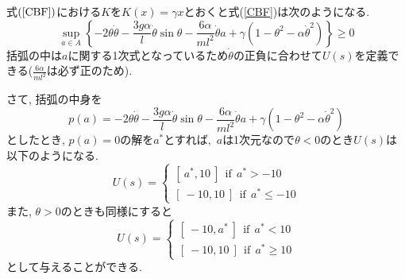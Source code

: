 \documentclass{jsarticle}
\begin{document}
式$(\ref{CBF})$における$K$を$K(x) = \gamma x$とおくと式(\ref{CBF})は次のようになる.
\begin{equation}
	\sup_{a\in A}\left\{-2\theta\dot{\theta}-\frac{3g\alpha}{l}\dot{\theta}\sin{\theta}-\frac{6\alpha}{ml^2}\dot{\theta} a+\gamma(1-\theta^2-\alpha\dot{\theta}^2)\right\} \geq 0 \label{special_cbf}
\end{equation}
括弧の中は$a$に関する1次式となっているため$\dot{\theta}$の正負に合わせて$U(s)$を定義できる($\frac{6\alpha}{ml^2}$は必ず正のため).\par
さて, 括弧の中身を
\begin{equation}
	p(a) = -2\theta\dot{\theta}-\frac{3g\alpha}{l}\dot{\theta}\sin{\theta}-\frac{6\alpha}{ml^2}\dot{\theta} a+\gamma(1-\theta^2-\alpha\dot{\theta}^2)
\end{equation}
としたとき, $p(a)=0$の解を$a^{*}$とすれば,~$a$は1次元なので$\theta<0$のとき$U(s)$は以下のようになる.
\begin{equation}
	U(s) = 
		\begin{cases}
			[~a^{*}, 10~]~~\textrm{if}~~ a^{*} > -10 \\
			[~-10, 10~]~~\textrm{if}~~ a^{*} \leq -10
		\end{cases}
\end{equation}
また, $\theta>0$のときも同様にすると
\begin{equation}
	U(s) = 
		\begin{cases}
			[~-10, a^{*}~]~~\textrm{if}~~ a^{*} < 10 \\
			[~-10, 10~]~~\textrm{if}~~ a^{*} \geq 10
		\end{cases}
\end{equation}
として与えることができる.
\end{document}
